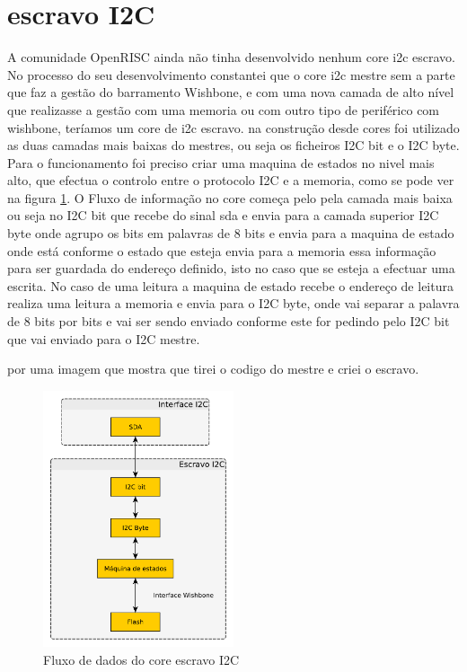 \section{escravo I2C}

A comunidade OpenRISC ainda não tinha desenvolvido nenhum core \acrshort{i2c} escravo. No processo do seu desenvolvimento constantei que o core \acrshort{i2c} mestre sem a parte que faz a gestão do barramento Wishbone, e com uma nova camada de alto nível que realizasse a gestão com uma memoria ou com outro tipo de periférico com wishbone, teríamos um core de \acrshort{i2c} escravo. na construção desde cores foi utilizado as duas camadas mais baixas do mestres, ou seja os ficheiros I2C bit e o I2C byte. Para o funcionamento foi preciso criar uma maquina de estados no nivel mais alto, que efectua o controlo entre o protocolo I2C e a memoria, como se pode ver na figura \ref{fig:fluxo_I2C_slave}. O Fluxo de informação no core começa pelo pela camada mais baixa ou seja no I2C bit que recebe do sinal \acrshort{sda} e envia para a camada superior I2C byte onde agrupo os bits em palavras de 8 bits e envia para a maquina de estado onde está conforme o estado que esteja envia para a memoria essa informação para ser guardada do endereço definido, isto no caso que se esteja a efectuar uma escrita. No caso de uma leitura a maquina de estado recebe o endereço de leitura realiza uma leitura a memoria e envia para o I2C byte, onde vai separar a palavra de 8 bits por bits e vai ser sendo enviado conforme este for pedindo pelo I2C bit que vai enviado para o I2C mestre.  

por uma imagem que mostra que tirei o codigo do mestre e criei o escravo.

\begin{figure}[!htb]
  \centering
  \includegraphics[width=0.50\textwidth]{grafos/diagrama_I2C_slave.pdf}
  \caption[Fluxo de dados do core escravo I2C]{Fluxo de dados do core escravo I2C}
  \label{fig:fluxo_I2C_slave}
\end{figure}

